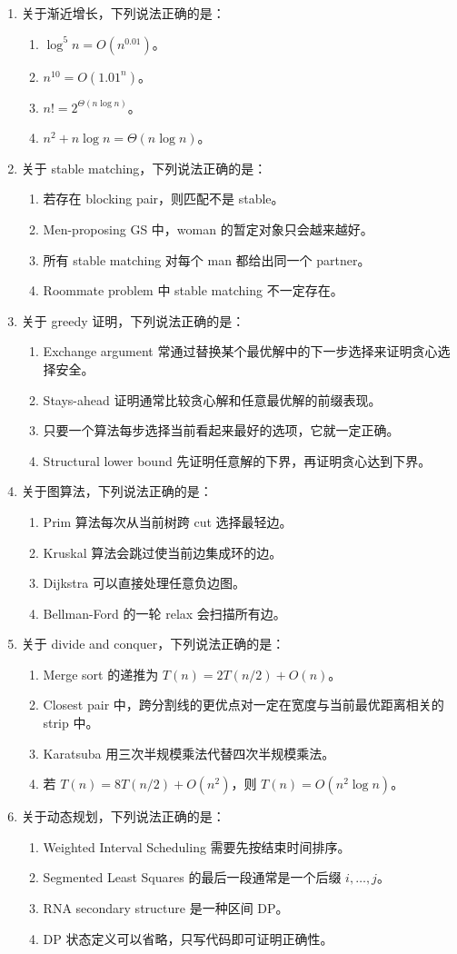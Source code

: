 \documentclass[UTF8,a4paper,11pt]{ctexart}
\newcommand{\choice}[1]{\item[$\square$] #1}
\begin{document}
\begin{enumerate}
  \item 关于渐近增长，下列说法正确的是：
  \begin{enumerate}
    \choice{$\log^5 n=O(n^{0.01})$。}
    \choice{$n^{10}=O(1.01^n)$。}
    \choice{$n!=2^{\Theta(n\log n)}$。}
    \choice{$n^2+n\log n=\Theta(n\log n)$。}
  \end{enumerate}

  \item 关于 stable matching，下列说法正确的是：
  \begin{enumerate}
    \choice{若存在 blocking pair，则匹配不是 stable。}
    \choice{Men-proposing GS 中，woman 的暂定对象只会越来越好。}
    \choice{所有 stable matching 对每个 man 都给出同一个 partner。}
    \choice{Roommate problem 中 stable matching 不一定存在。}
  \end{enumerate}

  \item 关于 greedy 证明，下列说法正确的是：
  \begin{enumerate}
    \choice{Exchange argument 常通过替换某个最优解中的下一步选择来证明贪心选择安全。}
    \choice{Stays-ahead 证明通常比较贪心解和任意最优解的前缀表现。}
    \choice{只要一个算法每步选择当前看起来最好的选项，它就一定正确。}
    \choice{Structural lower bound 先证明任意解的下界，再证明贪心达到下界。}
  \end{enumerate}

  \item 关于图算法，下列说法正确的是：
  \begin{enumerate}
    \choice{Prim 算法每次从当前树跨 cut 选择最轻边。}
    \choice{Kruskal 算法会跳过使当前边集成环的边。}
    \choice{Dijkstra 可以直接处理任意负边图。}
    \choice{Bellman-Ford 的一轮 relax 会扫描所有边。}
  \end{enumerate}

  \item 关于 divide and conquer，下列说法正确的是：
  \begin{enumerate}
    \choice{Merge sort 的递推为 $T(n)=2T(n/2)+O(n)$。}
    \choice{Closest pair 中，跨分割线的更优点对一定在宽度与当前最优距离相关的 strip 中。}
    \choice{Karatsuba 用三次半规模乘法代替四次半规模乘法。}
    \choice{若 $T(n)=8T(n/2)+O(n^2)$，则 $T(n)=O(n^2\log n)$。}
  \end{enumerate}

  \item 关于动态规划，下列说法正确的是：
  \begin{enumerate}
    \choice{Weighted Interval Scheduling 需要先按结束时间排序。}
    \choice{Segmented Least Squares 的最后一段通常是一个后缀 $i,\ldots,j$。}
    \choice{RNA secondary structure 是一种区间 DP。}
    \choice{DP 状态定义可以省略，只写代码即可证明正确性。}
  \end{enumerate}


\end{enumerate}
\end{document}
